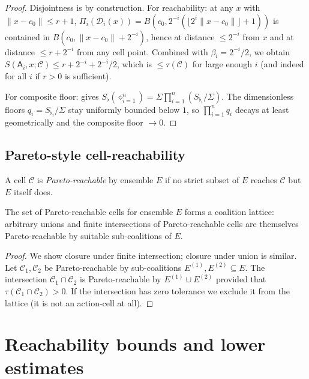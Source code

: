 \documentclass[11pt,twocolumn,a4paper]{article}
\newcommand{\D}{\mathcal{D}}
\newcommand{\Cell}{\mathcal{C}}
\newcommand{\agent}{\mathsf{A}}
\newcommand{\Sfloor}{S_{\flat}}
\newcommand{\norm}[1]{\lVert#1\rVert}
\newcommand{\Compose}{\diamond}
\begin{document}
\begin{proof}
Disjointness is by construction. For reachability: at any
$x$ with $\norm{x-c_0}\le r+1$, $\Pi_i(\D_i(x))=B(c_0,2^{-i}
(\lfloor 2^i\norm{x-c_0}\rfloor+1))$ is contained in
$B(c_0,\norm{x-c_0}+2^{-i})$, hence at distance $\le 2^{-i}$ from
$x$ and at distance $\le r+2^{-i}$ from any cell point. Combined with
$\beta_i=2^{-i}/2$, we obtain $S(\agent_i,x;\Cell)\le r+
2^{-i}+2^{-i}/2$, which is $\le\tau(\Cell)$ for large enough $i$ (and
indeed for all $i$ if $r>0$ is sufficient).

For composite floor:  gives
$\Sfloor(\Compose_{i=1}^n)=\Sigma\prod_{i=1}^n(\Sfloor_i/\Sigma)$.
The dimensionless floors $q_i=\Sfloor_i/\Sigma$ stay uniformly
bounded below $1$, so $\prod_{i=1}^n q_i$ decays at least
geometrically and the composite floor $\to 0$.
\end{proof}

\subsection{Pareto-style cell-reachability}

\begin{definition}\label{def:pareto}
A cell $\Cell$ is \emph{Pareto-reachable} by ensemble $E$ if no
strict subset of $E$ reaches $\Cell$ but $E$ itself does.
\end{definition}

\begin{theorem}\label{thm:coalition}
The set of Pareto-reachable cells for ensemble $E$ forms a coalition
lattice: arbitrary unions and finite intersections of
Pareto-reachable cells are themselves Pareto-reachable by suitable
sub-coalitions of $E$.
\end{theorem}

\begin{proof}
We show closure under finite intersection; closure under union is
similar. Let $\Cell_1,\Cell_2$ be Pareto-reachable by sub-coalitions
$E^{(1)},E^{(2)}\subseteq E$. The intersection $\Cell_1\cap\Cell_2$ is
Pareto-reachable by $E^{(1)}\cup E^{(2)}$ provided that
$\tau(\Cell_1\cap\Cell_2)>0$. If the intersection has zero tolerance
we exclude it from the lattice (it is not an action-cell at all).
\end{proof}

\section{Reachability bounds and lower estimates}
\label{sec:reach}
\end{document}
